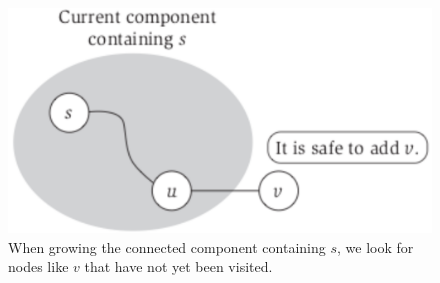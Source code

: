 \documentclass[12pt,a4paper]{book}
\begin{document}
\begin{figure}[h]
    \centering
    \label{fig:simpleGraph4}
    \includegraphics[width=\textwidth]{simpleGraph4}
    \caption{ When growing the connected component containing $s$, we look for nodes like $v$ that have not yet been visited.}
\end{figure}
\end{document}
